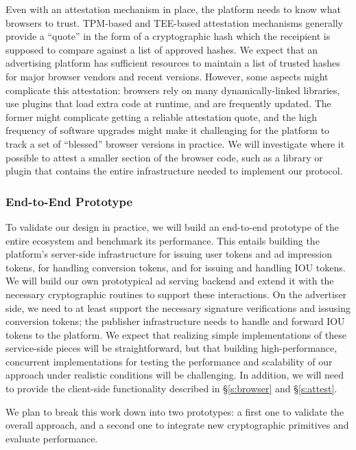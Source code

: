 %
Even with an attestation mechanism in place, the platform needs to know what browsers to trust.
%
TPM-based and TEE-based attestation mechanisms generally provide a ``quote'' in the form of a cryptographic hash which the receipient is supposed to compare against a list of approved hashes.
%
We expect that an advertising platform has sufficient resources to maintain a list of trusted hashes for major browser vendors and recent versions.
%
However, some aspects might complicate this attestation: browsers rely on many dynamically-linked libraries, use plugins that load extra code at runtime, and are frequently updated.
%
The former might complicate getting a reliable attestation quote, and the high frequency of software upgrades might make it challenging for the platform to track a set of ``blessed'' browser versions in practice.
%
We will investigate where it possible to attest a smaller section of the browser code, such as a library or plugin that contains the entire infrastructure needed to implement our protocol.
%

\subsubsection{End-to-End Prototype}
%
To validate our design in practice, we will build an end-to-end prototype of the entire ecosystem and benchmark its performance.
%
This entails building the platform's server-side infrastructure for issuing user tokens and ad impression tokens, for handling conversion tokens, and for issuing and handling IOU tokens.
%
We will build our own prototypical ad serving backend and extend it with the necessary cryptographic routines to support these interactions.
%
On the advertiser side, we need to at least support the necessary signature verifications and issusing conversion tokens; the publisher infrastructure needs to handle and forward IOU tokens to the platform.
%
We expect that realizing simple implementations of these service-side pieces will be straightforward, but that building high-performance, concurrent implementations for testing the performance and scalability of our approach under realistic conditions will be challenging.
%
In addition, we will need to provide the client-side functionality described in \S\ref{s:browser} and \S\ref{s:attest}.
%

%
We plan to break this work down into two prototypes: a first one to validate the overall approach, and a second one to integrate new cryptographic primitives and evaluate performance.
%

